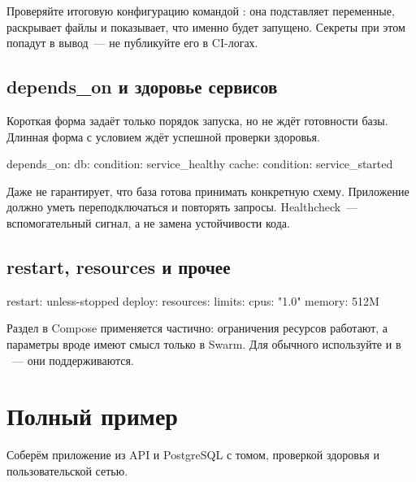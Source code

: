 \begin{tipbox}
Проверяйте итоговую конфигурацию командой
: она подставляет переменные, раскрывает
файлы и показывает, что именно будет запущено. Секреты при этом
попадут в вывод~--- не публикуйте его в CI-логах.
\end{tipbox}

\subsection{depends\_on и здоровье сервисов}

Короткая форма  задаёт только порядок запуска,
но не ждёт готовности базы. Длинная форма с условием ждёт успешной
проверки здоровья.

\begin{code}[language=composeyaml]
    depends_on:
      db:
        condition: service_healthy
      cache:
        condition: service_started
\end{code}

\begin{warnbox}
Даже  не гарантирует, что база
готова принимать конкретную схему. Приложение должно уметь
переподключаться и повторять запросы. Healthcheck~--- вспомогательный
сигнал, а не замена устойчивости кода.
\end{warnbox}

\subsection{restart, resources и прочее}

\begin{code}[language=composeyaml]
    restart: unless-stopped
    deploy:
      resources:
        limits:
          cpus: "1.0"
          memory: 512M
\end{code}

Раздел  в Compose применяется частично: ограничения
ресурсов работают, а параметры вроде  имеют смысл
только в Swarm. Для обычного  используйте
 и  в ~---
они поддерживаются.

\section{Полный пример}

Соберём приложение из API и PostgreSQL с томом, проверкой здоровья
и пользовательской сетью.


